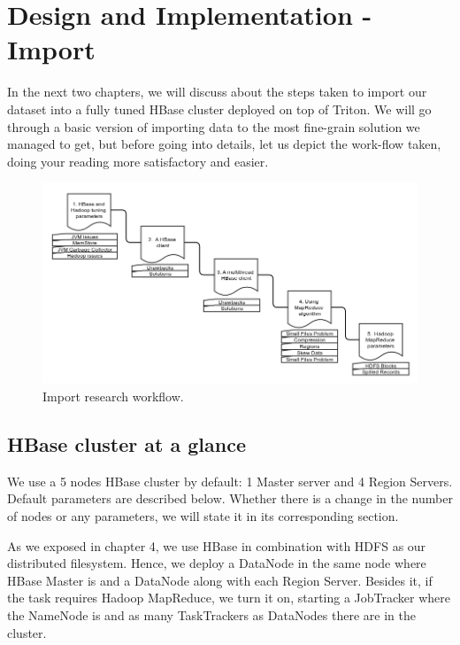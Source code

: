 \chapter{Design and Implementation - Import}
\label{chapter:Design and Implementation - Import}


In the next two chapters, we will discuss about the steps taken to import our dataset into a fully tuned HBase cluster deployed on top of Triton. We will go through a basic version of importing data to the most fine-grain solution we managed to get, but before going into details, let us depict the work-flow taken, doing your reading more satisfactory and easier.


\bigskip
\begin{figure}[htb]
\centering
\includegraphics[width=1\textwidth]{./images/approaches.png}
\caption{Import research workflow.} \label{fig:approaches}
\end{figure}




\section{HBase cluster at a glance}

We use a 5 nodes HBase cluster by default: 1 Master server and 4 Region Servers. Default parameters are described below. Whether there is a change in the number of nodes or any parameters, we will state it in its corresponding section.
\par
As we exposed in chapter 4, we use HBase in combination with HDFS as our distributed filesystem. Hence, we deploy a DataNode in the same node where HBase Master is and a DataNode along with each Region Server. Besides it, if the task requires Hadoop MapReduce, we turn it on, starting a JobTracker where the NameNode is and as many TaskTrackers as DataNodes there are in the cluster.

